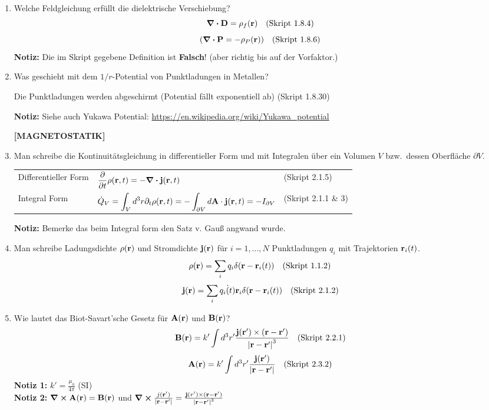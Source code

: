 \begin{enumerate}
  \item Welche Feldgleichung erfüllt die dielektrische Verschiebung?
        $$\div \vb D=\rho_f(\vb r)\quad\text{(Skript 1.8.4)}$$
        $$\qty(\div \vb P=-\rho_P(\vb r))\quad\text{(Skript 1.8.6)}$$
        \textbf{Notiz:} Die im Skript gegebene Definition ist 
        \textbf{Falsch}! (aber richtig bis auf der Vorfaktor.)

  \item Was geschieht mit dem $1/r$-Potential von Punktladungen in
        Metallen?
        \begin{center}
          Die Punktladungen werden abgeschirmt (Potential fällt 
          exponentiell ab)
          (Skript 1.8.30)
        \end{center}
        \textbf{Notiz:} Siehe auch Yukawa Potential: 
        \url{https://en.wikipedia.org/wiki/Yukawa_potential} 

  \clearpage
  \textbf{[MAGNETOSTATIK]}
  \item Man schreibe die Kontinuitätsgleichung in differentieller Form
        und mit Integralen über ein Volumen $V$ bzw.\ dessen Oberfläche 
        $\partial V$.
        \begin{center}
        \begin{tabular}{lll}
          Differentieller Form 
                            & $\displaystyle\pdv{t}\rho(\vb r, t)=
                               -\div\vb j(\vb r, t)$
                              & (Skript 2.1.5)\\
          Integral Form     & $\displaystyle\dot Q_V
                              =\int_V d^3r\partial_t\rho(\vb r,t)=
                              -\int_{\partial V}d\vb A\cdot
                              \vb j(\vb r, t)=-I_{\partial V}$
                              & (Skript 2.1.1 \& 3)\\
        \end{tabular}
        \end{center}
        \textbf{Notiz:} Bemerke das beim Integral form den Satz v. Gauß
        angwand wurde.

  \item Man schreibe Ladungsdichte $\rho(\vb r)$ und Stromdichte
        $\vb j(\vb r)$ für $i=1,\ldots,N$ Punktladungen $q_i$ mit 
        Trajektorien $\vb r_i(t)$.
        $$\rho(\vb r)=\sum_i q_i\delta(\vb r-\vb r_i(t))
        \quad \text{(Skript 1.1.2)}$$
        $$\vb j(\vb r)=\sum_i q_i\dot(t){\vb r}_i\delta(\vb r-\vb r_i(t))
        \quad \text{(Skript 2.1.2)}$$

  \item Wie lautet das Biot-Savart'sche Gesetz für $\vb A(\vb r)$ und
        $\vb B(\vb r)$?
        $$\vb B(\vb r)=k'\int d^3r'\frac{\vb j(\vb r')\times
        (\vb r-\vb r')}{\abs{\vb r-\vb r'}^3}
        \quad \text{(Skript 2.2.1)}$$
        $$\vb A(\vb r)=k'\int d^3r'\frac{\vb j(\vb r')}{\abs{\vb{r}-\vb{r}'}}
        \quad \text{(Skript 2.3.2)}$$
        \textbf{Notiz 1:} $k'=\frac{\mu_0}{4\pi}$ (SI)\\
        \textbf{Notiz 2:} $\curl \vb A(\vb r) = \vb B(\vb r)$ und 
        $\curl \frac{j(\vb r')}{\abs{\vb{r}-\vb{r}'}}
        =\frac{\vb j(r') \times (\vb r - \vb r')}{\abs{\vb r - \vb r'}^3}$


\end{enumerate}
